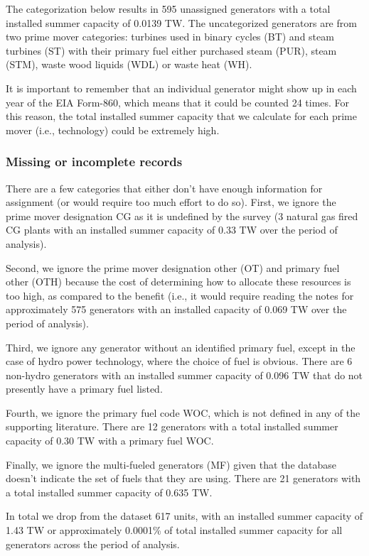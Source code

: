 \documentclass[10pt]{report}
\begin{document}
The categorization below results in 595 unassigned generators  with a total installed summer capacity of 0.0139 TW.
The uncategorized generators are from two prime mover categories: turbines used in binary cycles (BT) and steam turbines (ST) with their primary fuel either purchased steam (PUR), steam (STM), waste wood liquids (WDL) or waste heat (WH).

It is important to remember that an individual generator might show up in each year of the EIA Form-860, which means that it could be counted 24 times.
For this reason, the total installed summer capacity that we calculate for each prime mover (i.e., technology) could be extremely high. 

\subsubsection{Missing or incomplete records}
There are a few categories that either don't have enough information for assignment (or would require too much effort to do so). 
First, we ignore the prime mover designation CG as it is undefined by the survey (3 natural gas fired CG plants with an installed summer capacity of 0.33 TW over the period of analysis).

Second, we ignore the prime mover designation other (OT) and primary fuel other (OTH) because the cost of determining how to allocate these resources is too high, as compared to the benefit (i.e., it would require reading the notes for approximately 575 generators with an installed capacity of 0.069 TW over the period of analysis).

Third, we ignore any generator without an identified primary fuel, except in the case of hydro power technology, where the choice of fuel is obvious.
There are 6 non-hydro generators with an installed summer capacity of 0.096 TW that do not presently have a primary fuel listed.

Fourth, we ignore the primary fuel code WOC, which is not defined in any of the supporting literature. 
There are 12 generators with a total installed summer capacity of 0.30 TW with a primary fuel WOC.   

Finally, we ignore the multi-fueled generators (MF) given that the database doesn't indicate the set of fuels that they are using.
There are 21 generators with a total installed summer capacity of 0.635 TW. 

In total we drop from the dataset 617 units, with an installed summer capacity of 1.43 TW or approximately 0.0001\% of total installed summer capacity for all generators across the period of analysis.
\end{document}
